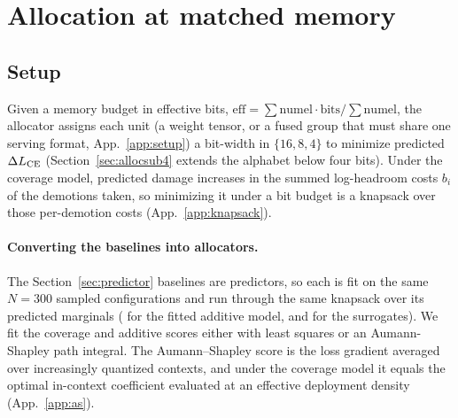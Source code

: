 
\section{Allocation at matched memory}\label{sec:allocation}

\subsection{Setup}\label{sec:allocsetup}

Given a memory budget in effective bits,
$\mathrm{eff} = \sum \mathrm{numel}\cdot\mathrm{bits} / \sum \mathrm{numel}$, the allocator assigns each
unit (a weight tensor, or a fused group that must share one serving format, App.~\ref{app:setup}) a
bit-width in $\{16,8,4\}$ to minimize predicted $\Delta L_{\mathrm{CE}}$ (Section~\ref{sec:allocsub4} extends the
alphabet below four bits). Under the coverage model, predicted damage increases
in the summed log-headroom costs $b_i$ of the demotions taken, so minimizing it under a bit budget is a
knapsack over those per-demotion costs (App.~\ref{app:knapsack}). 


\paragraph{Converting the baselines into allocators.} The
Section~\ref{sec:predictor} baselines are predictors, so each is fit on the same $N=300$
sampled configurations and run through the same knapsack over its predicted marginals ( for
the fitted additive model,  and  for the surrogates). 
We fit the coverage and additive scores either with least squares or an Aumann-Shapley path integral.
The Aumann--Shapley score is the loss gradient averaged over increasingly quantized contexts, and under the
coverage model it equals the optimal in-context coefficient evaluated at an effective deployment
density (App.~\ref{app:as}). 


